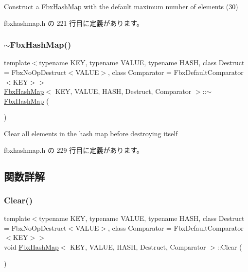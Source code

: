 Construct a \hyperlink{class_fbx_hash_map}{Fbx\+Hash\+Map} with the default maximum number of elements (30) 

 fbxhashmap.\+h の 221 行目に定義があります。

\mbox{\label{class_fbx_hash_map_a9b75e6940b7ebb7c82628117ce8479e2}} 
\subsubsection{\texorpdfstring{$\sim$\+Fbx\+Hash\+Map()}{~FbxHashMap()}}
{\footnotesize\ttfamily template$<$typename K\+EY, typename V\+A\+L\+UE, typename H\+A\+SH, class Destruct = Fbx\+No\+Op\+Destruct$<$\+V\+A\+L\+U\+E$>$, class Comparator = Fbx\+Default\+Comparator$<$\+K\+E\+Y$>$$>$ \\
\hyperlink{class_fbx_hash_map}{Fbx\+Hash\+Map}$<$ K\+EY, V\+A\+L\+UE, H\+A\+SH, Destruct, Comparator $>$\+::$\sim$\hyperlink{class_fbx_hash_map}{Fbx\+Hash\+Map} (\begin{DoxyParamCaption}{ }\end{DoxyParamCaption})\hspace{0.3cm}{\ttfamily [inline]}}

Clear all elements in the hash map before destroying itself 

 fbxhashmap.\+h の 229 行目に定義があります。



\subsection{関数詳解}
\mbox{\label{class_fbx_hash_map_a93c7f218e1b8b337296b1758fbe962b9}} 
\subsubsection{\texorpdfstring{Clear()}{Clear()}}
{\footnotesize\ttfamily template$<$typename K\+EY, typename V\+A\+L\+UE, typename H\+A\+SH, class Destruct = Fbx\+No\+Op\+Destruct$<$\+V\+A\+L\+U\+E$>$, class Comparator = Fbx\+Default\+Comparator$<$\+K\+E\+Y$>$$>$ \\
void \hyperlink{class_fbx_hash_map}{Fbx\+Hash\+Map}$<$ K\+EY, V\+A\+L\+UE, H\+A\+SH, Destruct, Comparator $>$\+::Clear (\begin{DoxyParamCaption}{ }\end{DoxyParamCaption})\hspace{0.3cm}{\ttfamily [inline]}}

